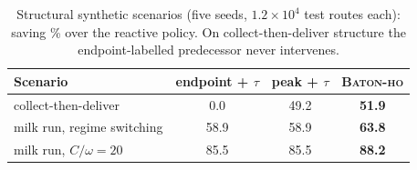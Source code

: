 \begin{table}[t]
\caption{Structural synthetic scenarios (five seeds, $1.2\times10^4$ test
routes each): saving \% over the reactive policy. On collect-then-deliver
structure the endpoint-labelled predecessor never intervenes.}
\label{tab:synthetic}
\centering
\begin{tabular}{l ccc}
\toprule
Scenario & endpoint + $\tau$ & peak + $\tau$ & \textsc{Baton-ho} \\
\midrule
collect-then-deliver & 0.0 & 49.2 & \textbf{51.9} \\
milk run, regime switching & 58.9 & 58.9 & \textbf{63.8} \\
milk run, $C/\omega = 20$ & 85.5 & 85.5 & \textbf{88.2} \\
\bottomrule
\end{tabular}
\end{table}
